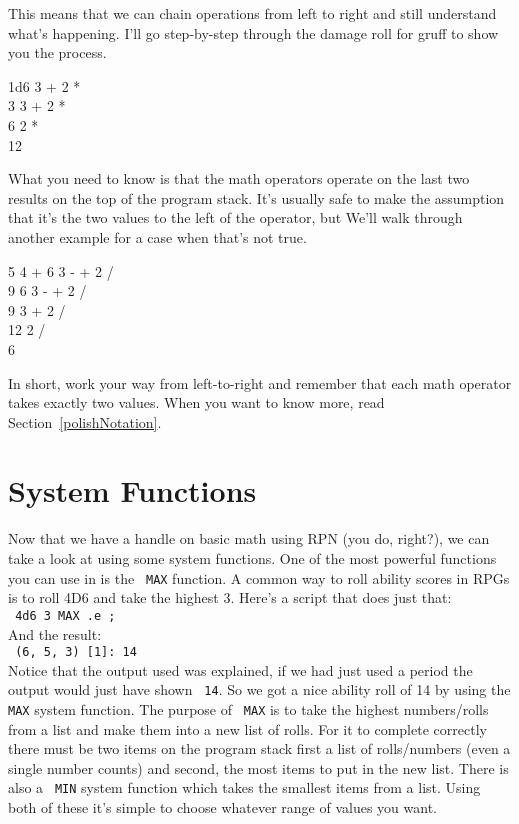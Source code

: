 This means that we can chain operations from left to right and still
understand what's happening. I'll go step-by-step through the
damage roll for gruff to show you the process.
\begin{center}
\begin{texttt}
1d6 3 + 2 *\\
3 3 + 2 *\\
6 2 *\\
12\\
\end{texttt}
\end{center}
What you need to know is that the math operators operate on the last two results
on the top of the program stack. It's usually safe to make the assumption that
it's the two values to the left of the operator, but We'll walk through another
example for a case when that's not true.\\
\begin{center}
\begin{texttt}
5 4 + 6 3 - + 2 /\\
9 6 3 - + 2 /\\
9 3 + 2 /\\
12 2 /\\
6\\
\end{texttt}
\end{center}
In short, work your way from left-to-right and remember that each math operator
takes exactly two values. When you want to know more, read 
Section~\ref{polishNotation}.

\section{System Functions}
\label{firstFunction}
Now that we have a handle on basic math using RPN (you do, right?), we can
take a look at using some system functions. One of the most powerful functions
you can use in \progLogo is the \texttt{ MAX} function. A common way to roll
ability scores in RPGs is to roll 4D6 and take the highest 3. Here's a
script that does just that:\\
\texttt{ 4d6 3 MAX .e ;}\\
And the result:\\
\texttt{  (6, 5, 3) [1]: 14}\\
Notice that the output used was explained, if we had just used a period the
output would just have shown \texttt{ 14}. So we got a nice ability roll of 14
by using the \texttt{ MAX} system function. The purpose of \texttt{ MAX} is to take the
highest numbers/rolls from a list and make them into a new list of rolls. For
it to complete correctly there must be two items on the program stack first a
list of rolls/numbers (even a single number counts) and second, the most
items to put in the new list. There is also a \texttt{ MIN} system function
which takes the smallest items from a list. Using both of these it's simple
to choose whatever range of values you want.

